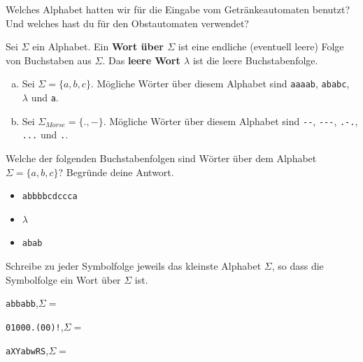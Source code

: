 \documentclass{article}
\begin{document}
\begin{exercise}
Welches Alphabet hatten wir für die Eingabe vom Getränkeautomaten benutzt? Und welches hast du für den Obstautomaten verwendet?\\

\blank[width=\linewidth]{}
\end{exercise}

\begin{definition}
Sei \(\Sigma\) ein Alphabet. Ein \textbf{Wort über \(\Sigma\)} ist eine endliche (eventuell leere) Folge von Buchstaben aus \(\Sigma\). Das \textbf{leere Wort \(\lambda\)} ist die leere Buchstabenfolge.
\end{definition}

\begin{example}
\begin{enumerate}[(a)]
    \item Sei \(\Sigma = \{a, b, c\}\). Mögliche Wörter über diesem Alphabet sind \texttt{aaaab}, \texttt{ababc}, \(\lambda\) und \texttt{a}.
    \item Sei \(\Sigma_{Morse} = \{.,-\}\). Mögliche Wörter über diesem Alphabet sind \verb|--|, \verb|---|, \verb|.-.|, \verb|...| und \verb|.|.
\end{enumerate}
\end{example}

\begin{exercise}
Welche der folgenden Buchstabenfolgen sind Wörter über dem Alphabet \(\Sigma = \{a, b, c\}\)? Begründe deine Antwort.
\begin{itemize}[label=$\square$]
    \item \texttt{abbbbcdccca}
    \item \(\lambda\)
    \item \texttt{abab}
\end{itemize}
\end{exercise}

\begin{exercise}[solution=true]
Schreibe zu jeder Symbolfolge jeweils das kleinste Alphabet \(\Sigma\), so dass die Symbolfolge ein Wort über \(\Sigma\) ist.
\begin{enumerate}[(a)]
{
    \item \texttt{abbabb},\hfill \(\Sigma = \)
    \item \texttt{01000.(00)!},\hfill \(\Sigma = \)
    \item \texttt{aXYabwRS},\hfill \(\Sigma = \)
    
}
\end{enumerate}
\end{exercise}
\end{document}
